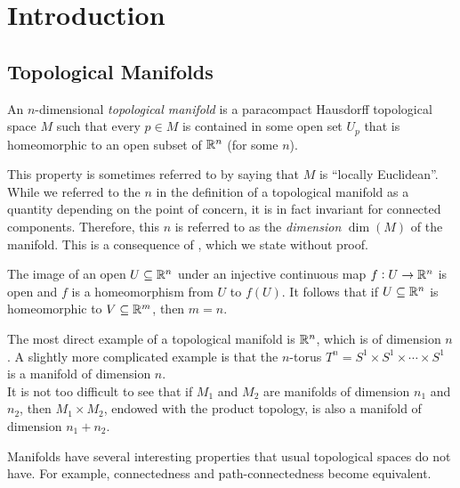 \section{Introduction}

\subsection{Topological Manifolds}

\begin{fdef}
	An $n$-dimensional \emph{topological manifold} is a paracompact Hausdorff topological space $M$ such that every $p \in M$ is contained in some open set $U_p$ that is homeomorphic to an open subset of $\mathbb{R}^n$ (for some $n$).
\end{fdef}
This property is sometimes referred to by saying that $M$ is ``locally Euclidean''. \\
While we referred to the $n$ in the definition of a topological manifold as a quantity depending on the point of concern, it is in fact invariant for connected components. Therefore, this $n$ is referred to as the \emph{dimension} $\dim(M)$ of the manifold. This is a consequence of , which we state without proof.
\begin{ftheo}
	\label{brouwers theorem}
	The image of an open $U \subseteq \mathbb{R}^n$ under an injective continuous map $f : U \to \mathbb{R}^n$ is open and $f$ is a homeomorphism from $U$ to $f(U)$. It follows that if $U \subseteq \mathbb{R}^n$ is homeomorphic to $V \subseteq \mathbb{R}^m$, then $m = n$.
\end{ftheo}

The most direct example of a topological manifold is $\mathbb{R}^n$, which is of dimension $n$. A slightly more complicated example is that the $n$-torus $T^n = S^1 \times S^1 \times \cdots \times S^1$ is a manifold of dimension $n$.\\
It is not too difficult to see that if $M_1$ and $M_2$ are manifolds of dimension $n_1$ and $n_2$, then $M_1 \times M_2$, endowed with the product topology, is also a manifold of dimension $n_1 + n_2$.

Manifolds have several interesting properties that usual topological spaces do not have. For example, connectedness and path-connectedness become equivalent.

